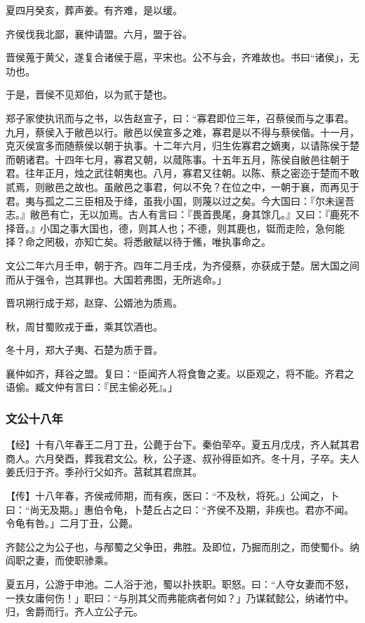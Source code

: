 \documentclass[]{article}
\begin{document}
夏四月癸亥，葬声姜。有齐难，是以缓。

齐侯伐我北鄙，襄仲请盟。六月，盟于谷。

晋侯蒐于黄父，遂复合诸侯于扈，平宋也。公不与会，齐难故也。书曰``诸侯」，无功也。

于是，晋侯不见郑伯，以为贰于楚也。

郑子家使执讯而与之书，以告赵宣子，曰：``寡君即位三年，召蔡侯而与之事君。九月，蔡侯入于敝邑以行。敝邑以侯宣多之难，寡君是以不得与蔡侯偕。十一月，克灭侯宣多而随蔡侯以朝于执事。十二年六月，归生佐寡君之嫡夷，以请陈侯于楚而朝诸君。十四年七月，寡君又朝，以蒇陈事。十五年五月，陈侯自敝邑往朝于君。往年正月，烛之武往朝夷也。八月，寡君又往朝。以陈、蔡之密迩于楚而不敢贰焉，则敝邑之故也。虽敝邑之事君，何以不免？在位之中，一朝于襄，而再见于君。夷与孤之二三臣相及于绛，虽我小国，则蔑以过之矣。今大国曰：『尔未逞吾志。』敝邑有亡，无以加焉。古人有言曰：『畏首畏尾，身其馀几。』又曰：『鹿死不择音。』小国之事大国也，德，则其人也；不德，则其鹿也，铤而走险，急何能择？命之罔极，亦知亡矣。将悉敝赋以待于鯈，唯执事命之。

文公二年六月壬申，朝于齐。四年二月壬戌，为齐侵蔡，亦获成于楚。居大国之间而从于强令，岂其罪也。大国若弗图，无所逃命。」

晋巩朔行成于郑，赵穿、公婿池为质焉。

秋，周甘蜀败戎于垂，乘其饮酒也。

冬十月，郑大子夷、石楚为质于晋。

襄仲如齐，拜谷之盟。复曰：``臣闻齐人将食鲁之麦。以臣观之，将不能。齐君之语偷。臧文仲有言曰：『民主偷必死』。」

\hypertarget{header-n1275}{%
\subsubsection{文公十八年}\label{header-n1275}}

【经】十有八年春王二月丁丑，公薨于台下。秦伯荦卒。夏五月戊戌，齐人弑其君商人。六月癸酉，葬我君文公。秋，公子遂、叔孙得臣如齐。冬十月，子卒。夫人姜氏归于齐。季孙行父如齐。莒弑其君庶其。

【传】十八年春，齐侯戒师期，而有疾，医曰：``不及秋，将死。」公闻之，卜曰：``尚无及期。」惠伯令龟，卜楚丘占之曰：``齐侯不及期，非疾也。君亦不闻。令龟有咎。」二月丁丑，公薨。

齐懿公之为公子也，与邴蜀之父争田，弗胜。及即位，乃掘而刖之，而使蜀仆。纳阎职之妻，而使职骖乘。

夏五月，公游于申池。二人浴于池，蜀以扑抶职。职怒。曰：``人夺女妻而不怒，一抶女庸何伤！」职曰：``与刖其父而弗能病者何如？」乃谋弑懿公，纳诸竹中。归，舍爵而行。齐人立公子元。
\end{document}

